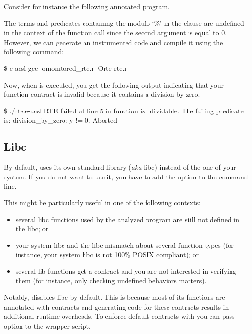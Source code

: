 Consider for instance the following annotated program.


The terms and predicates containing the modulo `\%' in the  clause
are undefined in the context of the  function call since the second
argument is equal to 0.  However, we can generate an instrumented code and
compile it using the following command:

\begin{logs}
\$ e-acsl-gcc -omonitored_rte.i -Orte rte.i
\end{logs}

Now, when  is executed, you get the following output indicating
that your function contract is invalid because it contains a division by zero.

\begin{logs}
\$ ./rte.e-acsl
RTE failed at line 5 in function is_dividable.
The failing predicate is:
division_by_zero: y != 0.
Aborted
\end{logs}


\subsection{Libc}

By default, \framac uses its own standard library (\emph{aka} libc) instead of
the one of your system. If you do not want to use it, you have to add the option
 to the \framac command
line.

This might be particularly useful in one of the following contexts:
\begin{itemize}
  \item several libc functions used by the analyzed program are still not defined
        in the \framac libc; or
  \item your system libc and the \framac libc mismatch about several function
        types (for instance, your system libc is not 100\% POSIX compliant); or
  \item several \framac lib functions get a contract and you are not interested in
        verifying them (for instance, only checking undefined behaviors matters).
\end{itemize}

\begin{important}
  Notably, \eacslgcc disables \framac libc by default. This is because most of
  its functions are annotated with \eacsl contracts and generating code for
  these contracts results in additional runtime overheads. To enforce default
  \framac contracts with \eacslgcc you can pass  option to the wrapper
  script.
\end{important}


